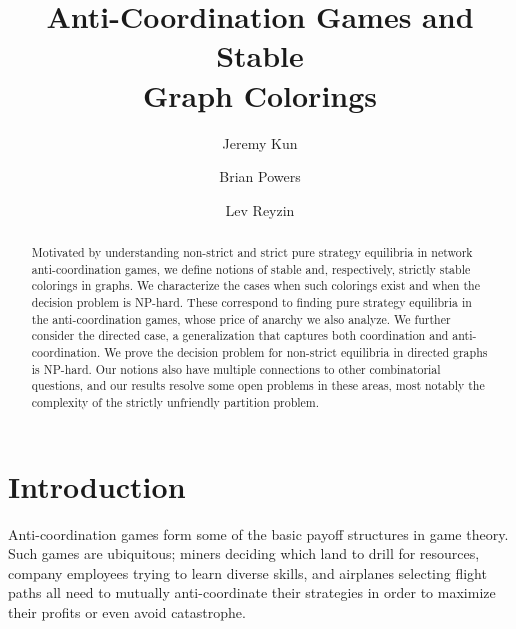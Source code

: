 \documentclass{llncs}
\title{Anti-Coordination Games and Stable \\Graph Colorings}
\begin{document}
\author{Jeremy Kun \and Brian Powers \and Lev Reyzin}


\maketitle

\begin{abstract}
Motivated by understanding non-strict and strict pure strategy equilibria in
network anti-coordination games, we define notions of stable and, respectively,
strictly stable colorings in graphs.  We characterize the cases when such
colorings exist and when the decision problem is NP-hard. These correspond to
finding pure strategy equilibria in the anti-coordination games, whose price of
anarchy we also analyze.  We further consider the directed case, a
generalization that captures both coordination and anti-coordination. We prove
the decision problem for non-strict equilibria in directed graphs is NP-hard.
Our notions also have multiple connections to other combinatorial questions,
and our results resolve some open problems in these areas, most notably the
complexity of the strictly unfriendly partition problem.
\end{abstract}

\section{Introduction}

Anti-coordination games form some of the basic payoff structures in game
theory.  Such games are ubiquitous; miners deciding which land to drill for
resources, company employees trying to learn diverse skills, and airplanes
selecting flight paths all need to mutually anti-coordinate their strategies in
order to maximize their profits or even avoid catastrophe.
\end{document}
